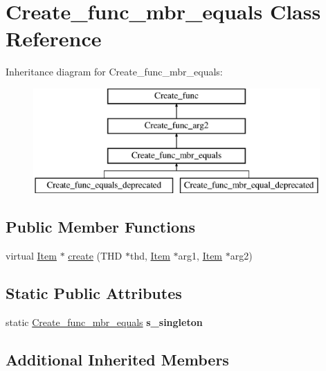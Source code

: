 \hypertarget{classCreate__func__mbr__equals}{}\section{Create\+\_\+func\+\_\+mbr\+\_\+equals Class Reference}
\label{classCreate__func__mbr__equals}
Inheritance diagram for Create\+\_\+func\+\_\+mbr\+\_\+equals\+:\begin{figure}[H]
\begin{center}
\leavevmode
\includegraphics[height=4.000000cm]{classCreate__func__mbr__equals}
\end{center}
\end{figure}
\subsection*{Public Member Functions}
\begin{DoxyCompactItemize}
\item 
virtual \mbox{\hyperlink{classItem}{Item}} $\ast$ \mbox{\hyperlink{classCreate__func__mbr__equals_aa2b2943bb9160c98a16e832b4bd0d2da}{create}} (T\+HD $\ast$thd, \mbox{\hyperlink{classItem}{Item}} $\ast$arg1, \mbox{\hyperlink{classItem}{Item}} $\ast$arg2)
\end{DoxyCompactItemize}
\subsection*{Static Public Attributes}
\begin{DoxyCompactItemize}
\item 
\mbox{\label{classCreate__func__mbr__equals_a10555961c9e2668d0751797868d9a6de}} 
static \mbox{\hyperlink{classCreate__func__mbr__equals}{Create\+\_\+func\+\_\+mbr\+\_\+equals}} {\bfseries s\+\_\+singleton}
\end{DoxyCompactItemize}
\subsection*{Additional Inherited Members}


